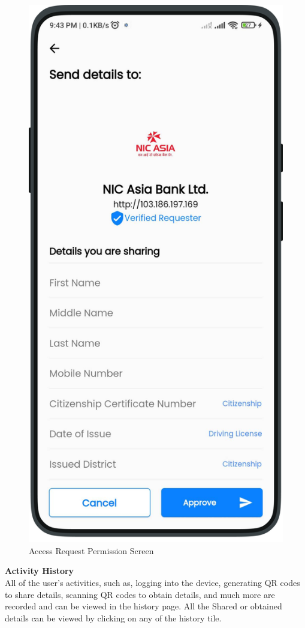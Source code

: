          \begin{figure}[H]
            \centering
            \includegraphics[width=0.3\linewidth]{images/results/mobile/DataAccessRequest.png}
            \caption[Access Request Permission Screen]{Access Request Permission Screen}
            \label{fig:DataAccessRequest.png}
            \end{figure}
        \textbf{Activity History}\\
        All of the user's activities, such as, logging into the device, generating QR codes to share details, scanning QR codes to obtain details, and much more are recorded and can be viewed in the history page. All the Shared or obtained details can be viewed by clicking on any of the history tile.
        \newpage
